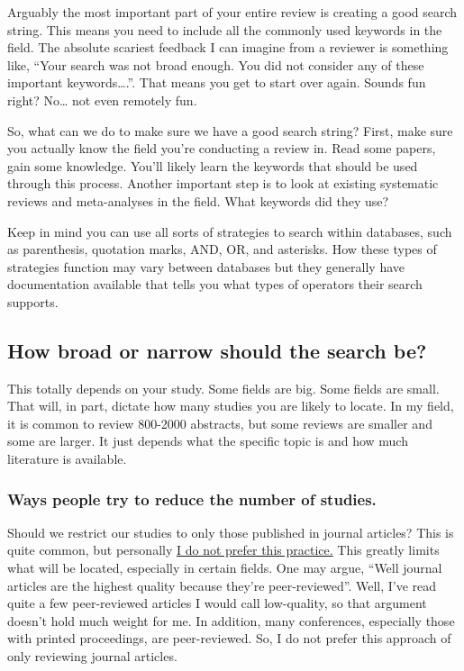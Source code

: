 \documentclass[
]{book}
\begin{document}
Arguably the most important part of your entire review is creating a good search string. This means you need to include all the commonly used keywords in the field. The absolute scariest feedback I can imagine from a reviewer is something like, ``Your search was not broad enough. You did not consider any of these important keywords\ldots.''. That means you get to start over again. Sounds fun right? No\ldots{} not even remotely fun.

So, what can we do to make sure we have a good search string? First, make sure you actually know the field you're conducting a review in. Read some papers, gain some knowledge. You'll likely learn the keywords that should be used through this process. Another important step is to look at existing systematic reviews and meta-analyses in the field. What keywords did they use?

Keep in mind you can use all sorts of strategies to search within databases, such as parenthesis, quotation marks, AND, OR, and asterisks. How these types of strategies function may vary between databases but they generally have documentation available that tells you what types of operators their search supports.

\hypertarget{how-broad-or-narrow-should-the-search-be}{%
\subsection{How broad or narrow should the search be?}\label{how-broad-or-narrow-should-the-search-be}}

This totally depends on your study. Some fields are big. Some fields are small. That will, in part, dictate how many studies you are likely to locate. In my field, it is common to review 800-2000 abstracts, but some reviews are smaller and some are larger. It just depends what the specific topic is and how much literature is available.

\hypertarget{ways-people-try-to-reduce-the-number-of-studies.}{%
\subsubsection{Ways people try to reduce the number of studies.}\label{ways-people-try-to-reduce-the-number-of-studies.}}

Should we restrict our studies to only those published in journal articles? This is quite common, but personally \ul{I do not prefer this practice.} This greatly limits what will be located, especially in certain fields. One may argue, ``Well journal articles are the highest quality because they're peer-reviewed''. Well, I've read quite a few peer-reviewed articles I would call low-quality, so that argument doesn't hold much weight for me. In addition, many conferences, especially those with printed proceedings, are peer-reviewed. So, I do not prefer this approach of only reviewing journal articles.
\end{document}

